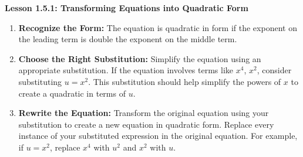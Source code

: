 \begin{center}
\textbf{Lesson 1.5.1: Transforming Equations into Quadratic Form}
\end{center}

\vspace*{1ex}



\begin{enumerate}[label = \color{blue}\arabic*. ]
   \item \textbf{Recognize the Form:} The equation is quadratic in form if the exponent on the leading term is double the exponent on the middle term. 
   \item \textbf{Choose the Right Substitution:} Simplify the equation using an appropriate substitution. If the equation involves terms like $x^4$, $x^2$, consider substituting $u = x^2$. This substitution should help simplify the powers of $x$ to create a quadratic in terms of $u$.
   \item \textbf{Rewrite the Equation:} Transform the original equation using your substitution to create a new equation in quadratic form. Replace every instance of your substituted expression in the original equation. For example, if $u = x^2$, replace $x^4$ with $u^2$ and $x^2$ with $u$.
\end{enumerate}



